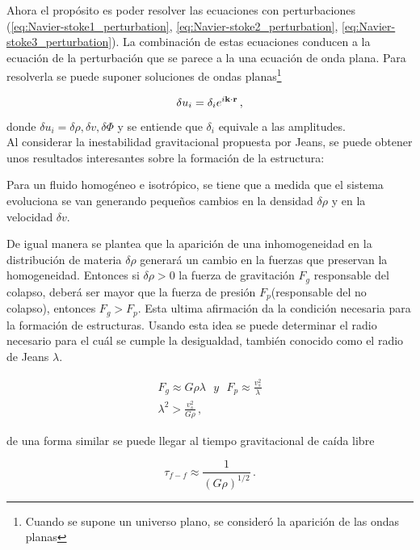 Ahora el propósito es poder resolver las ecuaciones con perturbaciones (\ref{eq:Navier-stoke1_perturbation}, \ref{eq:Navier-stoke2_perturbation}, \ref{eq:Navier-stoke3_perturbation}). 
La combinación de estas ecuaciones conducen a la ecuación de la perturbación que se parece a la una ecuación de onda plana. Para resolverla
se puede suponer soluciones de ondas planas\footnote{Cuando se supone un universo plano, se consideró la aparición de las ondas planas}

\begin{equation}
\delta u_{i} = \delta_{i}e^{i\bf{k}\cdot \bf{r}}\,,
\end{equation}
%
donde $\delta u_{i}= \delta\rho, \delta v, \delta\Phi$ y se entiende que $\delta_{i}$ equivale a las amplitudes. 
~\\

Al considerar la inestabilidad gravitacional propuesta por Jeans, se puede obtener unos resultados  interesantes sobre la formación de la estructura:

Para un fluido homogéneo e isotrópico, se tiene que a medida que el sistema evoluciona se van generando pequeños cambios en la densidad $\delta \rho$ y en la velocidad $\delta v$.

De igual manera se plantea que la aparición de una inhomogeneidad en la distribución de materia $\delta\rho$  generará un cambio en la fuerzas que preservan la homogeneidad. Entonces si $\delta\rho>0 $  la fuerza de gravitación $F_{g}$ responsable del colapso, deberá ser mayor que la fuerza de presión $F_{p}$(responsable del no colapso), entonces   $F_{g}>F_{p}$. Esta ultima afirmación da la condición necesaria para la formación de estructuras. Usando esta idea se puede determinar el radio necesario para el cuál se cumple la desigualdad, también conocido como el radio de Jeans $\lambda$.  

\begin{eqnarray}
F_{g} \approx G\rho\lambda \ \ \  y \ \ \ F_{p}\approx\frac{v_{s}^{2}}{\lambda}\\
\lambda^{2} > \frac{v_{s}^{2}}{G\rho} \,,
\end{eqnarray}

de una forma similar se puede llegar al tiempo gravitacional de caída libre 

\begin{equation}
\tau_{f-f} \approx \frac{1}{(G\rho)^{1/2}}\,.
\end{equation}


